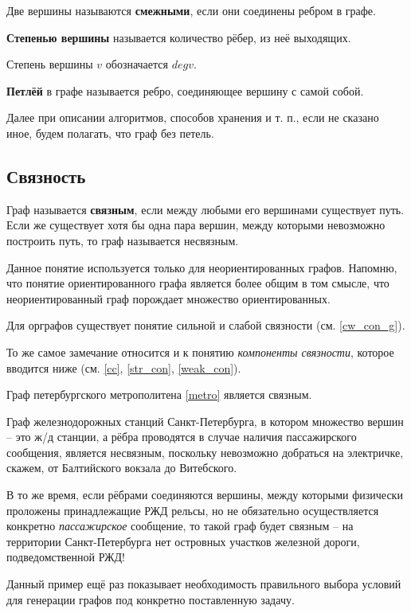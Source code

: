 \begin{definition}
	Две вершины называются \textbf{смежными}, если они соединены ребром в графе.
\end{definition}

\begin{definition}
	\textbf{Степенью вершины} называется количество рёбер, из неё выходящих.
	
	Степень вершины $v$ обозначается $deg v$.
\end{definition}

\begin{definition}
	\textbf{Петлёй} в графе называется ребро, соединяющее вершину с самой собой.
	
	Далее при описании алгоритмов, способов хранения и т. п., если не сказано иное, будем полагать, что граф без петель.
\end{definition}

\subsection{Связность}
\begin{definition}
	Граф называется \textbf{связным}, если между любыми его вершинами существует путь. Если же существует хотя бы одна пара вершин, между которыми невозможно построить путь, то граф называется несвязным.
\end{definition}

\begin{remark}
	Данное понятие используется только для неориентированных графов. Напомню, что понятие ориентированного графа является более общим в том смысле, что неориентированный граф порождает множество ориентированных.
	
	Для орграфов существует понятие сильной и слабой связности (см. \ref{cw_con_g}).
	
	То же самое замечание относится и к понятию \textit{компоненты связности}, которое вводится ниже (см. \ref{cc}, \ref{str_con}, \ref{weak_con}).
\end{remark}

\begin{example}
	Граф петербургского метрополитена \ref{metro} является связным.
\end{example}

\begin{example}
	Граф железнодорожных станций Санкт-Петербурга, в котором множество вершин -- это ж/д станции, а рёбра проводятся в случае наличия пассажирского сообщения, является несвязным, поскольку невозможно добраться на электричке, скажем, от Балтийского вокзала до Витебского.
	
	В то же время, если рёбрами соединяются вершины, между которыми физически проложены принадлежащие РЖД рельсы, но не обязательно осуществляется конкретно \textit{пассажирское} сообщение, то такой граф будет связным -- на территории Санкт-Петербурга нет островных участков железной дороги, подведомственной РЖД!
	
	Данный пример ещё раз показывает необходимость правильного выбора условий для генерации графов под конкретно поставленную задачу.
\end{example}

